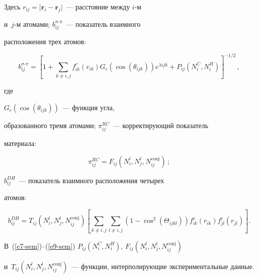 Здесь $r_{ij}=\vert \mathbf{r}_i-\mathbf{r}_j\vert$~--- расстояние между $i$-м 

и~$j$-м атомами; $b_{ij}^{\sigma\mbox{-}\pi}$~--- показатель взаимного 

расположения трех атомов:

\begin{equation}

 b_{ij}^{\sigma\mbox{-}\pi} = \left[ 1+\sum\limits_{k\not= i,j} 

 f_{ik}^c \left(r_{ik}\right) 

G_c\left( \cos \left(\theta_{ijk}\right)\right) e^{\lambda ijk}+P_{ij} \left( N_i^C, 

N_i^H\right)\right]^{-1/2}\,,

\label{e7-sem}

\end{equation}

где

$G_c(\cos(\theta_{ijk}))$~--- функция угла, 

образованного тремя атомами; $\pi_{ij}^{RC}$~--- корректирующий показатель 

материала:

\begin{equation}

  \pi_{ij}^{RC} = F_{ij}\left( N_i^l, N_j^l, N_{ij}^{\mathrm{conj}}\right)\,; 

\label{e8-sem}

\end{equation}

$b_{ij}^{DH}$~--- показатель взаимного расположения четырех 

атомов:

\begin{equation}

  b_{ij}^{DH} = T_{ij} \left( N_i^l, N_j^l, N_{ij}^{\mathrm{conj}}\right) \left[ 

\sum\limits_{k\not= i,j} \sum\limits_{l\not= i, j} \left( 1-\cos^2\left( 

\Theta_{ijkl}\right)\right) f_{ik}^c (r_{ik}) f^c_{jl}(r_{jl})\right].

  \label{e9-sem}

  \end{equation}

 В~(\ref{e7-sem})--(\ref{e9-sem})  $P_{ij}(N_i^C, N_i^H)$, $F_{ij}(N_i^l, N_j^l, N_{ij}^{\mathrm{conj}})$

 и~$T_{ij}(N_i^l, 

N_j^l, N_{ij}^{\mathrm{conj}})$~--- функции, интерполирующие экспериментальные данные.



